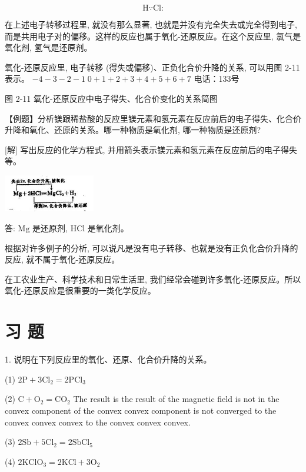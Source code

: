 \documentclass[10pt]{article}
\begin{document}
\[
\text{H}\because \mathrm{{Cl}}\text{:}
\]

在上述电子转移过程里, 就没有那么显著, 也就是并没有完全失去或完全得到电子, 而是共用电子对的偏移。这样的反应也属于氧化-还原反应。在这个反应里, 氯气是氧化剂, 氢气是还原剂。

氧化-还原反应里, 电子转移 (得失或偏移)、正负化合价升降的关系, 可以用图 2-11 表示。 \(- 4 - 3 - 2 - 1\;0 + 1 + 2 + 3 + 4 + 5 + 6 + 7\) 电话：133号

图 2-11 氧化-还原反应中电子得失、化合价变化的关系简图

【例题】分析镁跟稀盐酸的反应里镁元素和氢元素在反应前后的电子得失、化合价升降和氧化、还原的关系。哪一种物质是氧化剂, 哪一种物质是还原剂?

[解] 写出反应的化学方程式, 并用箭头表示镁元素和氢元素在反应前后的电子得失等。

\begin{center}
	\includegraphics[max width=0.3\textwidth]{images/01912d0f-097c-7e75-8f32-4f326cd86c9f_44_999339.jpg}
\end{center}

答: \(\mathrm{{Mg}}\) 是还原剂, \(\mathrm{{HCl}}\) 是氧化剂。

根据对许多例子的分析, 可以说凡是没有电子转移、也就是没有正负化合价升降的反应, 就不属于氧化-还原反应。

在工农业生产、科学技术和日常生活里, 我们经常会碰到许多氧化-还原反应。所以氧化-还原反应是很重要的一类化学反应。

\section*{习 题}

1. 说明在下列反应里的氧化、还原、化合价升降的关系。

(1) \(2\mathrm{P} + 3{\mathrm{{Cl}}}_{2} = 2{\mathrm{{PCl}}}_{3}\)

(2) \(\mathrm{C} + {\mathrm{O}}_{2} = {\mathrm{{CO}}}_{2}\) The result is the result of the magnetic field is not in the convex component of the convex convex component is not converged to the convex convex convex to the convex convex convex.

(3) \(2\mathrm{{Sb}} + 5{\mathrm{{Cl}}}_{2} = 2{\mathrm{{SbCl}}}_{5}\)

(4) \(2{\mathrm{{KClO}}}_{3} = 2\mathrm{{KCl}} + 3{\mathrm{O}}_{2}\)
\end{document}
